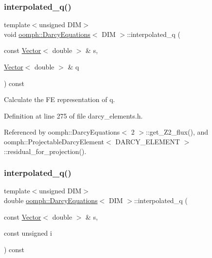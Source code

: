 \subsubsection{\texorpdfstring{interpolated\+\_\+q()}{interpolated\_q()}\hspace{0.1cm}{\footnotesize\ttfamily [1/2]}}
{\footnotesize\ttfamily template$<$unsigned D\+IM$>$ \\
void \hyperlink{classoomph_1_1DarcyEquations}{oomph\+::\+Darcy\+Equations}$<$ D\+IM $>$\+::interpolated\+\_\+q (\begin{DoxyParamCaption}\item[{const \hyperlink{classoomph_1_1Vector}{Vector}$<$ double $>$ \&}]{s,  }\item[{\hyperlink{classoomph_1_1Vector}{Vector}$<$ double $>$ \&}]{q }\end{DoxyParamCaption}) const\hspace{0.3cm}{\ttfamily [inline]}}



Calculate the FE representation of q. 



Definition at line 275 of file darcy\+\_\+elements.\+h.



Referenced by oomph\+::\+Darcy\+Equations$<$ 2 $>$\+::get\+\_\+\+Z2\+\_\+flux(), and oomph\+::\+Projectable\+Darcy\+Element$<$ D\+A\+R\+C\+Y\+\_\+\+E\+L\+E\+M\+E\+N\+T $>$\+::residual\+\_\+for\+\_\+projection().

\mbox{\label{classoomph_1_1DarcyEquations_a38e9886909c756f121dd3d0ae6036328}} 
\subsubsection{\texorpdfstring{interpolated\+\_\+q()}{interpolated\_q()}\hspace{0.1cm}{\footnotesize\ttfamily [2/2]}}
{\footnotesize\ttfamily template$<$unsigned D\+IM$>$ \\
double \hyperlink{classoomph_1_1DarcyEquations}{oomph\+::\+Darcy\+Equations}$<$ D\+IM $>$\+::interpolated\+\_\+q (\begin{DoxyParamCaption}\item[{const \hyperlink{classoomph_1_1Vector}{Vector}$<$ double $>$ \&}]{s,  }\item[{const unsigned}]{i }\end{DoxyParamCaption}) const\hspace{0.3cm}{\ttfamily [inline]}}



